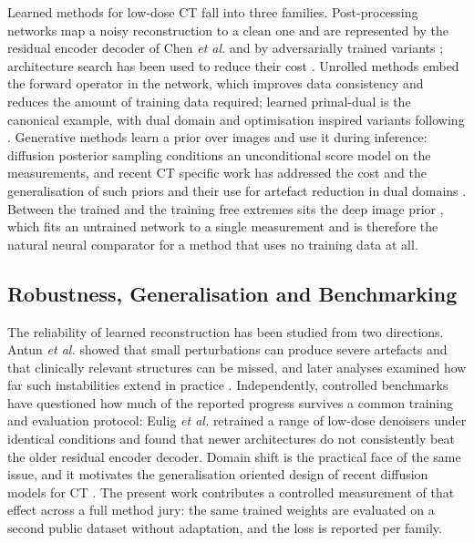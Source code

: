 Learned methods for low-dose CT fall into three families. Post-processing
networks map a noisy reconstruction to a clean one and are represented by the
residual encoder decoder of Chen \emph{et al.} \cite{chen2017redcnn} and by
adversarially trained variants \cite{yang2018wgan}; architecture search has
been used to reduce their cost \cite{lu2023m3nas}. Unrolled methods embed the
forward operator in the network, which improves data consistency and reduces
the amount of training data required; learned primal-dual \cite{adler2018lpd}
is the canonical example, with dual domain and optimisation inspired variants
following \cite{wu2021drone,xiang2021fista}. Generative methods learn a prior
over images and use it during inference: diffusion posterior sampling
\cite{chung2023dps} conditions an unconditional score model on the
measurements, and recent CT specific work has addressed the cost and the
generalisation of such priors \cite{gao2024corediff} and their use for
artefact reduction in dual domains \cite{liu2024mar}. Between the trained and
the training free extremes sits the deep image prior
\cite{ulyanov2018dip,baguer2020dip}, which fits an untrained network to a
single measurement and is therefore the natural neural comparator for a
method that uses no training data at all.

\subsection{Robustness, Generalisation and Benchmarking}

The reliability of learned reconstruction has been studied from two
directions. Antun \emph{et al.} \cite{antun2020} showed that small
perturbations can produce severe artefacts and that clinically relevant
structures can be missed, and later analyses examined how far such
instabilities extend in practice \cite{genzel2023}. Independently, controlled
benchmarks have questioned how much of the reported progress survives a
common training and evaluation protocol: Eulig \emph{et al.} \cite{eulig2024}
retrained a range of low-dose denoisers under identical conditions and found
that newer architectures do not consistently beat the older residual encoder
decoder. Domain shift is the practical face of the same issue, and it
motivates the generalisation oriented design of recent diffusion models for
CT \cite{gao2024corediff}. The present work contributes a controlled
measurement of that effect across a full method jury: the same trained
weights are evaluated on a second public dataset without adaptation, and the
loss is reported per family.

